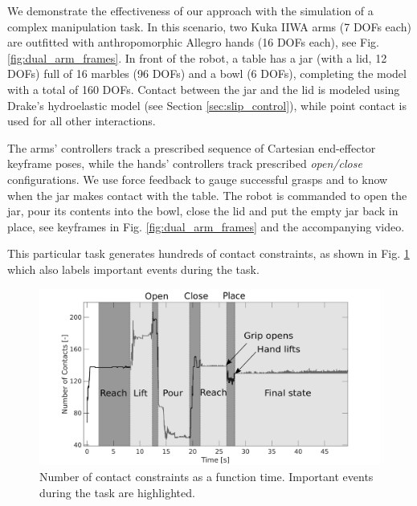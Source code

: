 
We demonstrate the effectiveness of our approach with the simulation of a
complex manipulation task. In this scenario, two Kuka IIWA arms (7 DOFs each)
are outfitted with anthropomorphic Allegro hands (16 DOFs each), see Fig.
\ref{fig:dual_arm_frames}. In front of the robot, a table has a jar (with a lid,
12 DOFs) full of 16 marbles (96 DOFs) and a bowl (6 DOFs), completing the model
with a total of 160 DOFs. Contact between the jar and the lid is modeled using
Drake's hydroelastic model \cite{bib:elandt2019pressure,
bib:masterjohn2021discrete} (see Section \ref{sec:slip_control}), while point
contact is used for all other interactions. 

The arms' controllers track a prescribed sequence of Cartesian end-effector
keyframe poses, while the hands' controllers track prescribed \emph{open/close}
configurations. We use force feedback to gauge successful grasps and to know
when the jar makes contact with the table. The robot is commanded to open the
jar, pour its contents into the bowl, close the lid and put the empty jar back
in place, see keyframes in Fig. \ref{fig:dual_arm_frames} and the accompanying
video. 

This particular task generates hundreds of contact constraints, as shown in Fig.
\ref{fig:dual_arm_contacts} which also labels important events during the task.

\begin{figure}[!h]
	\centering
    \includegraphics[width=0.9\columnwidth]{figures/dual_arm/dual_arm_contact.png}
    \caption{\label{fig:dual_arm_contacts} Number of contact constraints as a
    function time. Important events during the task are highlighted.}
\end{figure}

